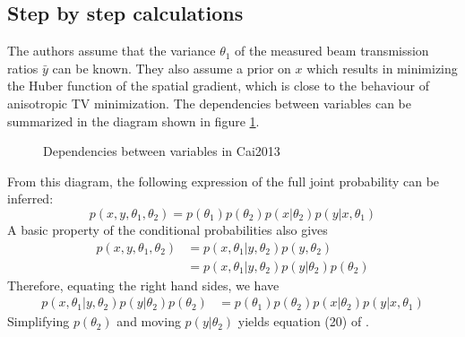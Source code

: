 \documentclass[a4paper, 10pt]{article}
\begin{document}
\subsection{Step by step calculations}
The authors assume that the variance $\theta_1$ of the measured beam transmission ratios $\bar{y}$ can be known. 
They also assume a prior on $x$ which results in minimizing the Huber function of the spatial gradient, which
is close to the behaviour of anisotropic TV minimization. 
The dependencies between variables can be summarized in the diagram shown in figure \ref{fig:dependenciesDiagram}.
\begin{figure}
 \begin{center}
 \end{center}
 \caption{Dependencies between variables in Cai2013}
 \label{fig:dependenciesDiagram}
\end{figure}
%
From this diagram, the following expression of the full joint probability can be inferred:
\begin{equation*}
  p(x,y,\theta_1, \theta_2) = p(\theta_1) p(\theta_2) p(x | \theta_2) p(y | x, \theta_1)
\end{equation*}
A basic property of the conditional probabilities also gives
\begin{equation*}
 \begin{split}
  p(x,y,\theta_1, \theta_2) &= p(x,\theta_1 |y,\theta_2) p(y, \theta_2) \\
			    &= p(x,\theta_1 |y,\theta_2) p(y | \theta_2) p(\theta_2)
 \end{split}
\end{equation*}
%
Therefore, equating the right hand sides, we have
\begin{equation*}
 \begin{split}
  p(x,\theta_1 |y,\theta_2) p(y | \theta_2) p(\theta_2) &= p(\theta_1) p(\theta_2) p(x | \theta_2) p(y | x, \theta_1)
 \end{split}
\end{equation*}
Simplifying $p(\theta_2)$ and moving $p(y | \theta_2)$ yields equation (20) of \cite{cai_full-spectral_2013}.
\end{document}
